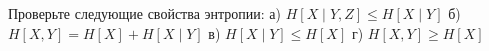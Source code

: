 \setcounter{curtask}{1}


\begin{task}
    Проверьте следующие свойства энтропии:
    а) $H[X \mid Y, Z] \le H[X \mid Y]$ б) $H[X, Y] = H[X] + H[X \mid Y]$
    в) $H[X \mid Y] \le H[X]$ г) $H[X, Y] \ge H[X]$
\end{task}


